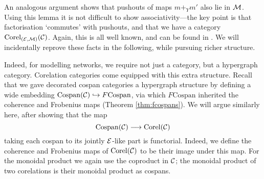 An analogous argument shows that pushouts of maps $m+_Ym'$ also lie in $\mathcal M$.
Using this lemma it is not difficult to show associativity---the key point is
that factorisation `commutes' with pushouts, and that we have a category
$\operatorname{{Corel}}_{(\mathcal E,\mathcal M)}(\mathcal C)$. Again, this is all well known, and can be found
in \cite{JW00}. We will incidentally reprove these facts in the following,
while pursuing richer structure.


%
%

Indeed, for modelling networks, we require not just a category, but a hypergraph
category. Corelation categories come equipped with this extra structure.  Recall
that we gave decorated cospan categories a hypergraph structure by defining a
wide embedding $\mathrm{Cospan}(\mathcal C) \hookrightarrow F\mathrm{Cospan}$, via
which $F\mathrm{Cospan}$ inherited the coherence and Frobenius maps (Theorem
\ref{thm:fcospans}). We will argue similarly here, after showing that the map
\[
  \operatorname{{Cospan}}(\mathcal C) \longrightarrow \operatorname{{Corel}}(\mathcal C)
\]
taking each cospan to its jointly $\mathcal E$-like part is functorial. Indeed, we
define the coherence and Frobenius maps of $\operatorname{{Corel}}(\mathcal C)$ to be their image
under this map. For the monoidal product we again use the coproduct in $\mathcal C$;
the monoidal product of two corelations is their monoidal product as cospans.

